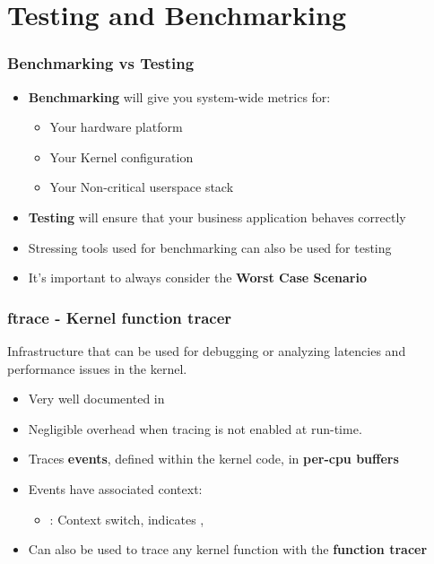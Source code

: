 \section{Testing and Benchmarking}

\begin{frame}
	\frametitle{Benchmarking vs Testing}
	\begin{itemize}
		\item \textbf{Benchmarking} will give you system-wide metrics for:
			\begin{itemize}
				\item Your hardware platform
				\item Your Kernel configuration
				\item Your Non-critical userspace stack
			\end{itemize}
		\item \textbf{Testing} will ensure that your business application behaves correctly
		\item Stressing tools used for benchmarking can also be used for testing
		\item It's important to always consider the \textbf{Worst Case Scenario}
	\end{itemize}
\end{frame}

\begin{frame}
  \frametitle{ftrace - Kernel function tracer}

  Infrastructure that can be used for debugging or analyzing latencies
  and performance issues in the kernel.

  \begin{itemize}
  \item Very well documented in 
  \item Negligible overhead when tracing is not enabled at run-time.
  \item Traces \textbf{events}, defined within the kernel code, in \textbf{per-cpu buffers}
  \item Events have associated context:
	  \begin{itemize}
		  \item {} : Context switch, indicates , 
	  \end{itemize}
  \item Can also be used to trace any kernel function with the \textbf{function tracer}
  \end{itemize}
\end{frame}

